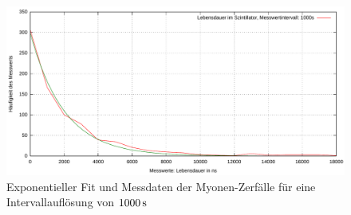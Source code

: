 \documentclass[numbers=noenddot,12pt,a4paper]{scrartcl}
\begin{document}
\begin{figure}[H]
	\centering
	\includegraphics[width=\textwidth]{messwerte/lifetime1000s.pdf}
	\caption{Exponentieller Fit und Messdaten der Myonen-Zerfälle für eine Intervallauflösung von $\unit[1000]{s}$}\label{img:zerfall1000s}
\end{figure}
\end{document}
